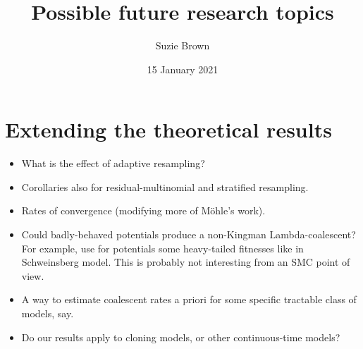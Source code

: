 \documentclass{article}
\title{Possible future research topics}
\author{Suzie Brown}
\date{15 January 2021}
\begin{document}
\maketitle
\thispagestyle{fancy}

\section*{Extending the theoretical results}
\begin{itemize}
\item What is the effect of adaptive resampling?
\item Corollaries also for residual-multinomial and stratified resampling.
\item Rates of convergence (modifying more of M\"ohle's work).
\item Could badly-behaved potentials produce a non-Kingman Lambda-coalescent? For example, use for potentials some heavy-tailed fitnesses like in Schweinsberg model. This is probably not interesting from an SMC point of view.
\item A way to estimate coalescent rates a priori for some specific tractable class of models, say.
\item Do our results apply to cloning models, or other continuous-time models?
\end{itemize}
\end{document}
